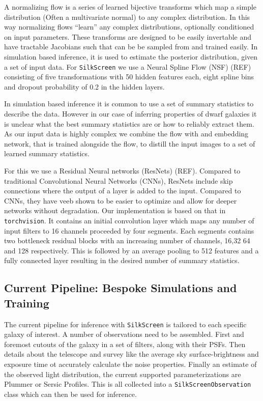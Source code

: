 \documentclass[twocolumn]{aastex631}
\newcommand{\code}[0]{\texttt{SilkScreen}}
\begin{document}
A normalizing flow is a series of learned bijective transforms which map a simple distribution (Often a multivariate normal) to any complex distribution. In this way normalizing flows ``learn'' any complex distributions, optionally conditioned on input parameters. These transforms are designed to be easily invertable and have tractable Jacobians such that can be be sampled from and trained easily. In simulation based inference, it is used to estimate the posterior distribution, given a set of input data. For \code{} we use a Neural Spline Flow (NSF) (REF) consisting of five transformations with 50 hidden features each, eight spline bins and dropout probability of 0.2 in the hidden layers.

In simulation based inference it is common to use a set of summary statistics to describe the data. However in our case of inferring properties of dwarf galaxies it is unclear what the best summary statistics are or how to reliably extract them. As our input data is highly complex we combine the flow with and embedding network, that is trained alongside the flow, to distill the input images to a set of learned summary statistics.

For this we use a Residual Neural networks (ResNets) (REF). Compared to traditional Convolutional Neural Networks (CNNs), ResNets include skip connections where the output of  a layer is added to the input. Compared to CNNs, they have veeb shown to be easier to optimize and allow for deeper networks without degradation. Our implementation is based on that in \texttt{torchvision}. It contains an initial convolution layer which maps any number of input filters to 16 channels proceeded by four segments. Each segments contains two bottleneck residual blocks with an increasing number of channels, 16,32 64 and 128 respectively. This is followed by an average pooling to 512 features and a fully connected layer resulting in the desired number of summary statistics.

\subsection{Current Pipeline: Bespoke Simulations and Training}
\label{sec:walkthrough}

The current pipeline for inference with \code{} is tailored to each specific galaxy of interest. A number of observations need to be assembled. First and foremost cutouts of the galaxy in a set of filters, along with their PSFs. Then details about the telescope and survey like the average sky surface-brightness and exposure time ot accurately calculate the noise properties. Finally an estimate of the observed light distribution, the current supported parameterizations are Plummer or Sersic Profiles. This is all collected into a \texttt{SilkScreenObservation} class which can then be used for inference. 
\end{document}
